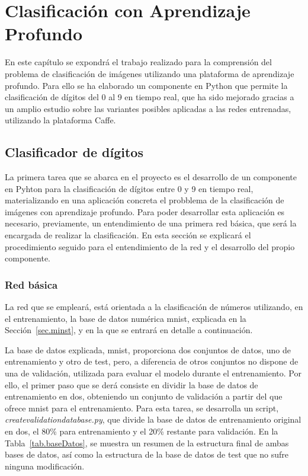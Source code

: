 \chapter{Clasificación con Aprendizaje Profundo}\label{cap.clasificacion}
En este capítulo se expondrá el trabajo realizado para la comprensión del problema de clasificación de imágenes utilizando una plataforma de aprendizaje profundo. Para ello se ha elaborado un componente en Python que permite la clasificación de dígitos del 0 al 9 en tiempo real, que ha sido mejorado gracias a un amplio estudio sobre las variantes posibles aplicadas a las redes entrenadas, utilizando la plataforma Caffe.

\section{Clasificador de dígitos}
La primera tarea que se abarca en el proyecto es el desarrollo de un componente en Pyhton para la clasificación de dígitos entre 0 y 9 en tiempo real, materializando en una aplicación concreta el probblema de la clasificación de imágenes con aprendizaje profundo. Para poder desarrollar esta aplicación es necesario, previamente, un entendimiento de una primera red básica, que será la encargada de realizar la clasificación. En esta sección se explicará el procedimiento seguido para el entendimiento de la red y el desarrollo del propio componente.

\subsection{Red básica}\label{sec.red}
La red que se empleará, está orientada a la clasificación de números utilizando, en el entrenamiento, la base de datos numérica \acrshort{mnist}, explicada en la Sección~\ref{sec.minst}, y en la que se entrará en detalle a continuación.\\
\vspace{-20pt}

La base de datos explicada, \acrshort{mnist}, proporciona dos conjuntos de datos, uno de entrenamiento y otro de test, pero, a diferencia de otros conjuntos no dispone de una de validación, utilizada para evaluar el modelo durante el entrenamiento. Por ello, el primer paso que se derá consiste en dividir la base de datos de entrenamiento en dos, obteniendo un conjunto de validación a partir del que ofrece \acrshort{mnist} para el entrenamiento. Para esta tarea, se desarrolla un script, \textit{createvalidationdatabase.py}, que divide la base de datos de entrenamiento original en dos, el 80\% para entrenamiento y el 20\% restante para validación. En la Tabla~\ref{tab.baseDatos}, se muestra un resumen de la estructura final de ambas bases de datos, así como la estructura de la base de datos de test que no sufre ninguna modificación.\\

